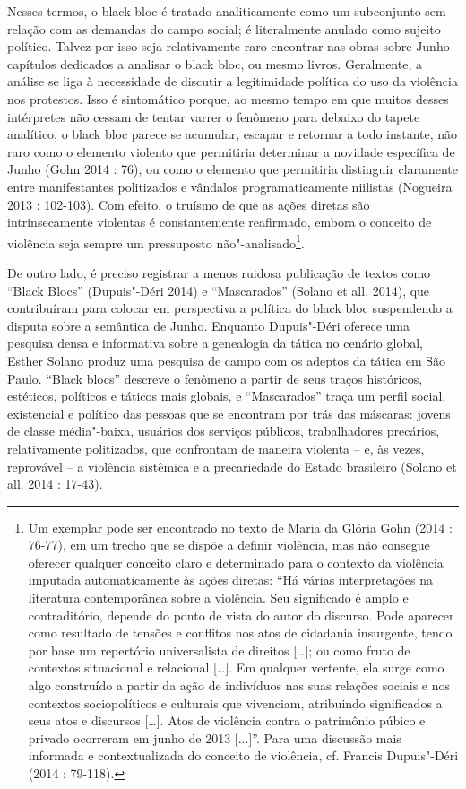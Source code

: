 Nesses termos, o black bloc é tratado
analiticamente como um subconjunto sem relação com as demandas do campo
social; é literalmente anulado como sujeito político. Talvez por isso
seja relativamente raro encontrar nas obras sobre Junho capítulos
dedicados a analisar o black bloc, ou mesmo livros. Geralmente, a
análise se liga à necessidade de discutir a legitimidade política do uso
da violência nos protestos. Isso é sintomático porque, ao mesmo tempo em
que muitos desses intérpretes não cessam de tentar varrer o fenômeno
para debaixo do tapete analítico, o black bloc parece se acumular,
escapar e retornar a todo instante, não raro como o elemento violento
que permitiria determinar a novidade específica de Junho (Gohn 2014 :
76), ou como o elemento que permitiria distinguir claramente entre
manifestantes politizados e vândalos programaticamente niilistas
(Nogueira 2013 : 102-103). Com efeito, o truísmo de que as ações diretas
são intrinsecamente violentas é constantemente reafirmado, embora o
conceito de violência seja sempre um pressuposto não"-analisado\footnote{Um
  exemplar pode ser encontrado no texto de Maria da Glória Gohn (2014 :
  76-77), em um trecho que se dispõe a definir violência, mas não
  consegue oferecer qualquer conceito claro e determinado para o
  contexto da violência imputada automaticamente às ações diretas: ``Há
  várias interpretações na literatura contemporânea sobre a violência.
  Seu significado é amplo e contraditório, depende do ponto de vista do
  autor do discurso. Pode aparecer como resultado de tensões e conflitos
  nos atos de cidadania insurgente, tendo por base um repertório
  universalista de direitos {[}\ldots{}{]}; ou como fruto de contextos
  situacional e relacional {[}\ldots{}{]}. Em qualquer vertente, ela
  surge como algo construído a partir da ação de indivíduos nas suas
  relações sociais e nos contextos sociopolíticos e culturais que
  vivenciam, atribuindo significados a seus atos e discursos
  {[}\ldots{}{]}. Atos de violência contra o patrimônio púbico e privado
  ocorreram em junho de 2013 {[}...{]}''. Para uma discussão mais
  informada e contextualizada do conceito de violência, cf. Francis
  Dupuis"-Déri (2014 : 79-118).}.

De outro lado, é preciso registrar a menos ruidosa publicação de textos
como ``Black Blocs'' (Dupuis"-Déri 2014) e ``Mascarados'' (Solano et all.
2014), que contribuíram para colocar em perspectiva a política do black
bloc suspendendo a disputa sobre a semântica de Junho. Enquanto
Dupuis"-Déri oferece uma pesquisa densa e informativa sobre a genealogia
da tática no cenário global, Esther Solano produz uma pesquisa de campo
com os adeptos da tática em São Paulo. ``Black blocs'' descreve o
fenômeno a partir de seus traços históricos, estéticos, políticos e
táticos mais globais, e ``Mascarados'' traça um perfil social,
existencial e político das pessoas que se encontram por trás das
máscaras: jovens de classe média"-baixa, usuários dos serviços públicos,
trabalhadores precários, relativamente politizados, que confrontam de
maneira violenta -- e, às vezes, reprovável -- a violência sistêmica e a
precariedade do Estado brasileiro (Solano et all. 2014 : 17-43).

